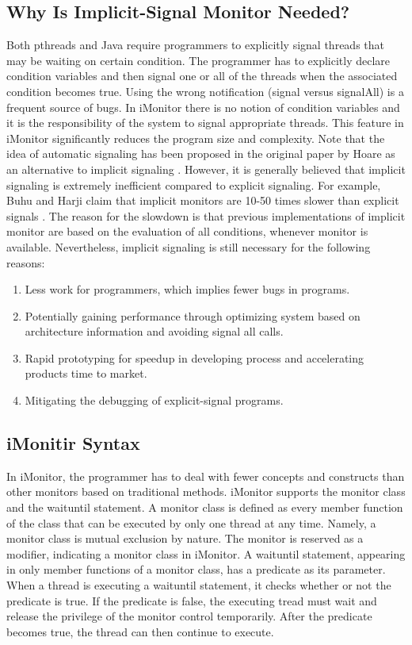 \documentclass[preprint]{sigplanconf}
\begin{document}
\subsection{Why Is Implicit-Signal Monitor Needed?}
Both pthreads and Java require programmers to explicitly
signal threads that may be waiting on certain condition. The programmer
has to explicitly declare condition variables and then signal one
or all of the threads when the associated condition becomes true.
Using the wrong notification (signal versus signalAll) is a frequent
source of bugs. In iMonitor there is no notion of condition variables
and it is the responsibility of the system to signal appropriate threads.
This feature in iMonitor significantly reduces the program size and complexity.
Note that the idea of automatic signaling has been proposed 
in the original paper by Hoare as an alternative to implicit
signaling \cite{hoa74}. However, it is generally believed that implicit 
signaling is extremely inefficient compared to explicit signaling. 
For example, Buhu and Harji claim that implicit monitors are 10-50 times
slower than explicit signals \cite{bfc95}. The reason for the slowdown is that
previous implementations of implicit monitor are based on the
evaluation of all conditions, whenever monitor is available. 
Nevertheless, implicit signaling is still necessary for the following reasons:
\begin{enumerate}
    \item Less work for programmers, which implies fewer bugs in programs.
    \item Potentially gaining performance through optimizing system based on
        architecture information and avoiding signal all calls.
    \item Rapid prototyping for speedup in developing process and accelerating
        products time to market.
    \item Mitigating the debugging of explicit-signal programs. 
\end{enumerate}

\subsection{iMonitir Syntax}
In iMonitor, the programmer has to deal with fewer concepts 
and constructs than other monitors based on traditional methods.
iMonitor supports the monitor class and the waituntil statement.
A monitor class is defined as every member function of the class that can be 
executed by only one thread at any time. Namely, a monitor class is mutual 
exclusion by nature. The monitor is reserved as a modifier, indicating a
monitor class in iMonitor. A waituntil statement, appearing in only member 
functions of a monitor class, has a predicate as its parameter. When a thread 
is executing a waituntil statement, it checks whether or not the predicate is 
true. If the predicate is false, the executing tread must wait and release 
the privilege of the monitor control temporarily. After the predicate becomes 
true, the thread can then continue to execute. 
\end{document}
